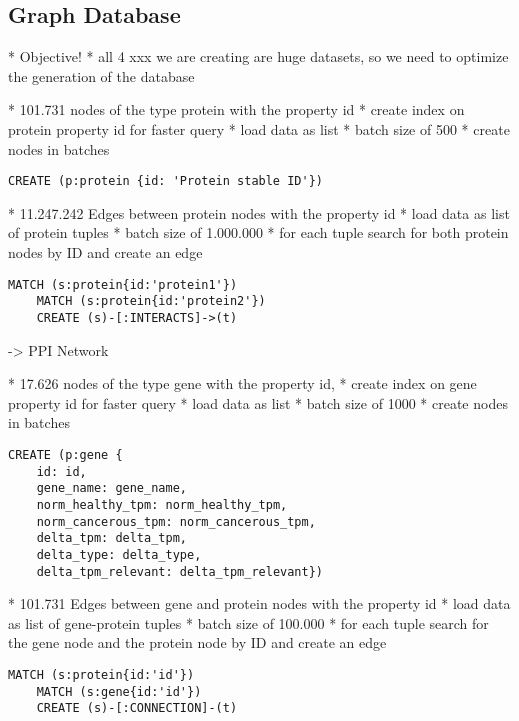\subsection{Graph Database} \label{subsec:graph_database}

* Objective!
* all 4 xxx we are creating are huge datasets, so we need to optimize the generation of the database

* 101.731 nodes of the type protein with the property id
* create index on protein property id for faster query
* load data as list
* batch size of 500
* create nodes in batches

\begin{lstlisting}[language=Cypher, label={lst:protein_nodes}]
    CREATE (p:protein {id: 'Protein stable ID'})
\end{lstlisting}

* 11.247.242 Edges between protein nodes with the property id
* load data as list of protein tuples
* batch size of 1.000.000
* for each tuple search for both protein nodes by ID and create an edge

\begin{lstlisting}[language=Cypher, label={lst:protein_edges}]
    MATCH (s:protein{id:'protein1'})
    MATCH (s:protein{id:'protein2'})
    CREATE (s)-[:INTERACTS]->(t)
\end{lstlisting}

-> PPI Network


* 17.626 nodes of the type gene with the property id,
* create index on gene property id for faster query
* load data as list
* batch size of 1000
* create nodes in batches

\begin{lstlisting}[language=Cypher, label={lst:gene_nodes}]
    CREATE (p:gene {
    id: id,
    gene_name: gene_name,
    norm_healthy_tpm: norm_healthy_tpm,
    norm_cancerous_tpm: norm_cancerous_tpm,
    delta_tpm: delta_tpm,
    delta_type: delta_type,
    delta_tpm_relevant: delta_tpm_relevant})
\end{lstlisting}


* 101.731 Edges between gene and protein nodes with the property id
* load data as list of gene-protein tuples
* batch size of 100.000
* for each tuple search for the gene node and the protein node by ID and create an edge

\begin{lstlisting}[language=Cypher, label={lst:gene_protein_edges}]
    MATCH (s:protein{id:'id'})
    MATCH (s:gene{id:'id'})
    CREATE (s)-[:CONNECTION]-(t)
\end{lstlisting}


